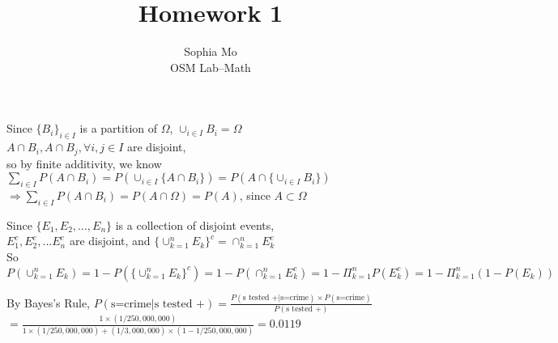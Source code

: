 \documentclass[12pt]{article}
\newenvironment{problem}[2][Problem]{\begin{trivlist}
\item[\hskip \labelsep {\bfseries #1}\hskip \labelsep {\bfseries #2.}]}{\end{trivlist}}
\begin{document}

\title{Homework 1}%
\author{Sophia Mo\\ %
OSM Lab--Math} %

\maketitle

\begin{problem}{1(3.6)}\hfill\linebreak
Since $\{B_i\}_{i\in I}$ is a partition of $\Omega$, $\cup_{i\in I}B_i=\Omega$\\
$A\cap B_i, A\cap B_j, \forall i,j\in I$ are disjoint,\\
so by finite additivity, we know\\
$\sum_{i\in I}P(A\cap B_i)=P(\cup_{i\in I}\{A\cap B_i\})=P(A\cap\{\cup_{i\in I}B_i\})$\\
$\Rightarrow \sum_{i\in I}P(A\cap B_i)=P(A\cap \Omega)=P(A)$, since $A\subset \Omega$
\end{problem}

\begin{problem}{1(3.8)}\hfill\linebreak
Since $\{E_1, E_2,...,E_n\}$ is a collection of disjoint events,\\
$E_1^c, E_2^c,...E_n^c$ are disjoint, and $\{\cup_{k=1}^nE_k\}^c=\cap_{k=1}^n{E_k^c}$\\
So $P(\cup_{k=1}^nE_k)=1-P(\{\cup_{k=1}^nE_k\}^c)=1-P(\cap_{k=1}^n{E_k^c})=1-\Pi_{k=1}^nP(E_k^c)=1-\Pi_{k=1}^n(1-P(E_k))$
\end{problem}

\begin{problem}{1(3.11)}\hfill\linebreak
By Bayes's Rule, $P(\text{s=crime}|\text{s tested +})=\frac{P(\text{s tested +}| \text{s=crime})\times P(\text{s=crime})}{P(\text{s tested +})}$\\
$=\frac{1\times (1/250,000,000)}{1\times (1/250,000,000)+(1/3,000,000)\times (1-1/250,000,000)}=0.0119$
\end{problem}
\end{document}
